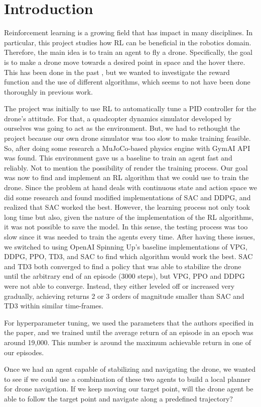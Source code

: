 \section{Introduction}

Reinforcement learning is a growing field that has impact in many disciplines. In particular, this 
project studies how RL can be beneficial in the robotics domain. Therefore, the main idea is to train 
an agent to fly a drone. Specifically, the goal is to make a drone move towards a desired point in 
space and the hover there. This has been done in the past \cite{adipandas} \cite{quadrl}, but we wanted
to investigate the reward function and the use of different algorithms, which seems to not have been done
thoroughly in previous work.

The project was initially to use RL to automatically tune a PID controller for the drone's attitude. For 
that, a quadcopter dynamics simulator developed by ourselves was going to act as the environment. But, 
we had to rethought the project because our own drone simulator was too slow to make training feasible. 
So, after doing some research a MuJoCo-based physics engine with GymAI API %
was found. This environment gave us a baseline to train an agent fast and reliably. Not to mention the 
possibility of render the training process.
Our goal was now to find and implement an RL algorithm that we could use to train the drone. Since the problem
at hand deals with continuous state and action space we did some research and found modified implementations \cite{tidyRL}
of SAC\cite{sac} and DDPG\cite{ddpg}, and realized that SAC worked the best. However, the learning process not only took long 
time but also, given the nature of the implementation of the RL algorithms, it was not 
possible to save the model. In this sense, the testing process was too slow since it was needed to 
train the agents every time. %
After having these issues, we switched to using OpenAI Spinning Up's \cite{spinningup} baseline implementations of VPG, DDPG, 
PPO, TD3, and SAC to find which algorithm would work the best. SAC and TD3 both converged to find a 
policy that was able to stabilize the drone until the arbitrary end of an episode (3000 steps), %
but VPG, PPO and DDPG were not able to converge. Instead, they either leveled off or increased very gradually, achieving returns 2 or 3 orders of magnitude smaller than SAC and TD3 within similar time-frames.

For hyperparameter tuning, we used the parameters that the authors specified in the paper, and we trained 
until the average return of an episode in an epoch was around 19,000. This number is around the maximum 
achievable return in one of our episodes.

Once we had an agent capable of stabilizing and navigating the drone, we wanted to see if we could use a 
combination of these two agents to build a local planner for drone navigation. If we keep moving our 
target point, will the drone agent be able to follow the target point and navigate along a predefined 
trajectory?